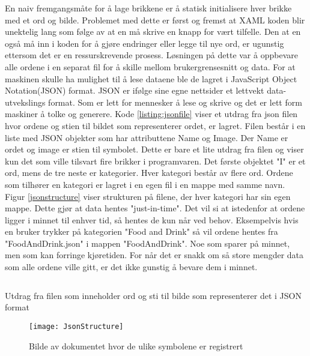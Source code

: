 {En naiv fremgangsmåte for å lage brikkene er å statisk initialisere hver brikke med et ord og bilde. Problemet med dette er først og fremst at XAML koden blir unektelig lang som følge av at en må skrive en knapp for vært tilfelle. Den at en også må inn i koden for å gjøre endringer eller legge til nye ord, er ugunstig ettersom det er en ressurskrevende prosess. Løsningen på dette var å oppbevare alle ordene i en separat fil for å skille mellom brukergrensesnitt og data. For at maskinen skulle ha mulighet til å lese dataene ble de lagret i JavaScript Object Notation(JSON) format. JSON er ifølge sine egne nettsider \cite{JSON7:online} et lettvekt data-utvekslings format. Som er lett for mennesker å lese og skrive og det er lett form maskiner å tolke og generere. Kode \ref{listing:jsonfile} viser et utdrag fra json filen hvor ordene og stien til bildet som representerer ordet, er lagret. Filen består i en liste med JSON objekter som har attributtene Name og Image. Der Name er ordet og image er stien til symbolet. Dette er bare et lite utdrag fra filen og viser kun det som ville tilsvart fire brikker i programvaren. Det første objektet "I" er et ord, mens de tre neste er kategorier. Hver kategori består av flere ord. Ordene som tilhører en kategori er lagret i en egen fil i en mappe med samme navn. Figur \ref{jsonstructure} viser strukturen på filene, der hver kategori har sin egen mappe. Dette gjør at data hentes "just-in-time". Det vil si at istedenfor at ordene ligger i minnet til enhver tid, så hentes de kun når ved behov. Eksempelvis hvis en bruker trykker på kategorien "Food and Drink" så vil ordene hentes fra "FoodAndDrink.json" i mappen "FoodAndDrink". Noe som sparer på minnet, men som kan forringe kjøretiden. For når det er snakk om så store mengder data som alle ordene ville gitt, er det ikke gunstig å bevare dem i minnet. 


\begin{listing}[ht] 
\inputminted[fontsize=\footnotesize, frame=lines,framesep=2mm,baselinestretch=1.2,bgcolor=lightgray,linenos]{json}{Code/JSONfile.json} 
\caption{Utdrag fra filen som inneholder ord og sti til bilde som representerer det i JSON format} 
\label{listing:jsonfile} 
\end{listing} 
 
 
 \begin{figure}[ht!] 
\centering 
\texttt{[image: JsonStructure]} 
\caption{Bilde av dokumentet hvor de ulike symbolene er registrert} 
\label{fig:jsonstructure} 
\end{figure} 


}
